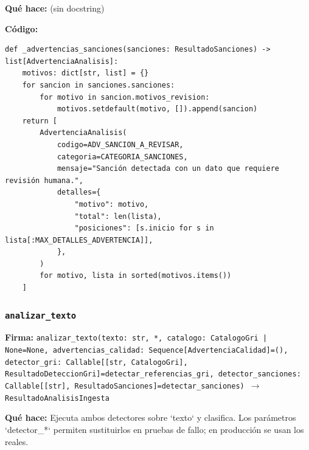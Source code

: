 \documentclass[11pt,a4paper]{article}
\begin{document}
\textbf{Qué hace:} (sin docstring)

\textbf{Código:}
\begin{lstlisting}
def _advertencias_sanciones(sanciones: ResultadoSanciones) -> list[AdvertenciaAnalisis]:
    motivos: dict[str, list] = {}
    for sancion in sanciones.sanciones:
        for motivo in sancion.motivos_revision:
            motivos.setdefault(motivo, []).append(sancion)
    return [
        AdvertenciaAnalisis(
            codigo=ADV_SANCION_A_REVISAR,
            categoria=CATEGORIA_SANCIONES,
            mensaje="Sanción detectada con un dato que requiere revisión humana.",
            detalles={
                "motivo": motivo,
                "total": len(lista),
                "posiciones": [s.inicio for s in lista[:MAX_DETALLES_ADVERTENCIA]],
            },
        )
        for motivo, lista in sorted(motivos.items())
    ]
\end{lstlisting}

\subsubsection*{\texttt{analizar\_texto}}
\textbf{Firma:} \texttt{analizar\_texto(texto: str, *, catalogo: CatalogoGri | None=None, advertencias\_calidad: Sequence[AdvertenciaCalidad]=(), detector\_gri: Callable[[str, CatalogoGri], ResultadoDeteccionGri]=detectar\_referencias\_gri, detector\_sanciones: Callable[[str], ResultadoSanciones]=detectar\_sanciones) $\rightarrow$ ResultadoAnalisisIngesta}

\textbf{Qué hace:} Ejecuta ambos detectores sobre `texto` y clasifica. Los parámetros `detector\_*`
permiten sustituirlos en pruebas de fallo; en producción se usan los reales.
\end{document}
